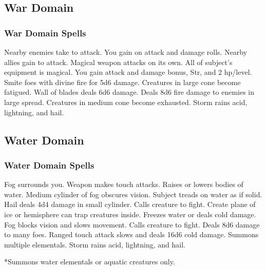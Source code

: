 \subsection{War Domain}
\subsubsection{War Domain Spells}
\begin{spelllist}
   Nearby enemies take  to attack.
   You gain  on attack and damage rolls.
   Nearby allies gain  to attack.
   Magical weapon attacks on its own.
  \spellhead[3]{}
  \spellhead[3]{}
   All of subject's equipment is magical.
   You gain attack and damage bonus,  Str, and 2 hp/level.
   Smite foes with divine fire for 5d6 damage.
   Creatures in large cone become fatigued.
   Wall of blades deals 6d6 damage.
  \spellhead[6]{}
  \spellhead[7]{}
  \spellhead[7]{}
   Deals 8d6 fire damage to enemies in large spread.
   Creatures in medium cone become exhausted.  
  \spellhead[9]{}
   Storm rains acid, lightning, and hail.
\end{spelllist}

\subsection{Water Domain}
\subsubsection{Water Domain Spells}
\begin{spelllist}
   Fog surrounds you.
  \spellhead[1]{}
   Weapon makes touch attacks. 
   Raises or lowers bodies of water.
   Medium cylinder of fog obscures vision.
   Subject treads on water as if solid.
   Hail deals 4d4 damage in small cylinder.
   Calls creature to fight.
  \spellhead[5]{}
   Create plane of ice or hemisphere can trap creatures inside.
   Freezes water or deals cold damage.
   Fog blocks vision and slows movement.
  \spellhead[7]{}
   Calls creature to fight.
   Deals 8d6 damage to many foes.
   Ranged touch attack slows and deals 16d6 cold damage.
   Summons multiple elementals.
   Storm rains acid, lightning, and hail.
\end{spelllist}
*Summons water elementals or aquatic creatures only.


